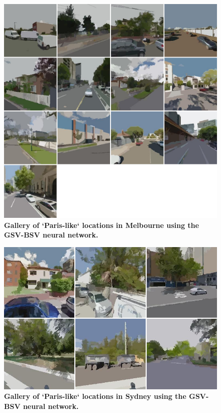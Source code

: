 \documentclass[Crown,sageh,times]{sagej}
\begin{document}
\begin{figure}[!htbp]
\centering    
\includegraphics[scale=0.35]{Images/PlosOne/Fig12.png}  
\caption{\bf Gallery of `Paris-like` locations in Melbourne using the GSV-BSV neural network.}    
 \label{fig:gsv_mel_gallery}  
\end{figure} 


\begin{figure}[!htbp]
\centering    
\includegraphics[scale=0.35]{Images/PlosOne/Fig13.png}  
\caption{\bf Gallery of `Paris-like` locations in Sydney using the GSV-BSV neural network.}    
 \label{fig:gsv_syd_gallery}  
\end{figure} 
\end{document}
